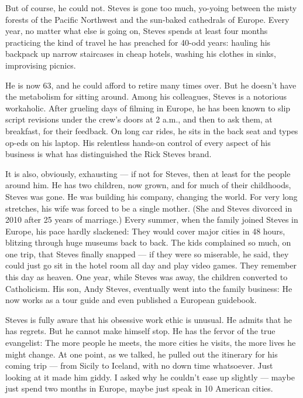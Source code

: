But of course, he could not. Steves is gone too much, yo-yoing between
the misty forests of the Pacific Northwest and the sun-baked cathedrals
of Europe. Every year, no matter what else is going on, Steves spends at
least four months practicing the kind of travel he has preached for
40-odd years: hauling his backpack up narrow staircases in cheap hotels,
washing his clothes in sinks, improvising picnics.

He is now 63, and he could afford to retire many times over. But he
doesn't have the metabolism for sitting around. Among his colleagues,
Steves is a notorious workaholic. After grueling days of filming in
Europe, he has been known to slip script revisions under the crew's
doors at 2 a.m., and then to ask them, at breakfast, for their feedback.
On long car rides, he sits in the back seat and types op-eds on his
laptop. His relentless hands-on control of every aspect of his business
is what has distinguished the Rick Steves brand.

It is also, obviously, exhausting --- if not for Steves, then at least
for the people around him. He has two children, now grown, and for much
of their childhoods, Steves was gone. He was building his company,
changing the world. For very long stretches, his wife was forced to be a
single mother. (She and Steves divorced in 2010 after 25 years of
marriage.) Every summer, when the family joined Steves in Europe, his
pace hardly slackened: They would cover major cities in 48 hours,
blitzing through huge museums back to back. The kids complained so much,
on one trip, that Steves finally snapped --- if they were so miserable,
he said, they could just go sit in the hotel room all day and play video
games. They remember this day as heaven. One year, while Steves was
away, the children converted to Catholicism. His son, Andy Steves,
eventually went into the family business: He now works as a tour guide
and even published a European guidebook.

Steves is fully aware that his obsessive work ethic is unusual. He
admits that he has regrets. But he cannot make himself stop. He has the
fervor of the true evangelist: The more people he meets, the more cities
he visits, the more lives he might change. At one point, as we talked,
he pulled out the itinerary for his coming trip --- from Sicily to
Iceland, with no down time whatsoever. Just looking at it made him
giddy. I asked why he couldn't ease up slightly --- maybe just spend two
months in Europe, maybe just speak in 10 American cities.

